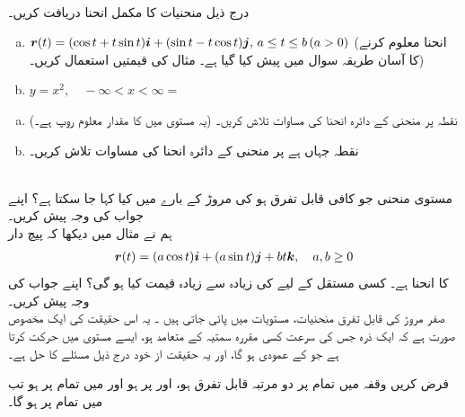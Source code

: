 \\
درج ذیل  منحنیات کا مکمل انحنا دریافت کریں۔
\begin{enumerate}[a.]
\item
${{\boldsymbol{r}}}(t)=(\cos t+t\sin t){\boldsymbol{i}}+(\sin t-t\cos t){\boldsymbol{j}},\, a\le t\le b\, (a>0)$
(انحنا معلوم کرنے کا آسان طریقہ سوال  میں پیش کیا گیا ہے۔ مثال  کی قیمتیں استعمال کریں۔)
\item
$y=x^2,\quad -\infty<x<\infty=$
\end{enumerate}
\begin{enumerate}[a.]
\item
نقطہ  پر منحنی  کے دائرہ انحنا کی مساوات  تلاش کریں۔ (یہ مستوی  میں  کا  مقدار معلوم روپ ہے۔)
\item
نقطہ  جہاں  ہے پر منحنی   کے دائرہ انحنا کی مساوات تلاش کریں۔
\end{enumerate}

\\
مستوی منحنی  جو کافی قابل تفرق ہو کی مروڑ کے بارے میں کیا کہا جا سکتا ہے؟ اپنے جواب کی وجہ پیش کریں۔
\\
ہم نے مثال  میں دیکھا کہ  پیچ دار 
\begin{align*}
{\ensuremath{{\boldsymbol{r}}}}(t)=(a\cos t){\boldsymbol{i}}+(a\sin t){\boldsymbol{j}}+bt{\boldsymbol{k}},\quad a,b\ge 0
\end{align*}
کا انحنا   ہے۔ کسی مستقل  کے لیے  کی زیادہ سے زیادہ قیمت کیا ہو گی؟ اپنے جواب کی وجہ پیش کریں۔
\\
صفر مروڑ کی قابل تفرق منحنیات،  مستویات میں پائی جاتی ہیں ۔ یہ  اس حقیقت کی ایک مخصوص صورت ہے کہ ایک ذرہ جس کی سرعت کسی مقررہ  سمتیہ  کے متعامد ہو، ایسے  مستوی میں حرکت کرتا ہے جو  کے عمودی ہو گا، اور    یہ حقیقت  از خود درج ذیل مسئلے  کا حل ہے۔

فرض کریں وقفہ  میں تمام  پر    دو مرتبہ قابل تفرق ہو، اور  پر  ہو اور  میں  تمام  پر   ہو تب  میں تمام  پر  ہو گا۔

